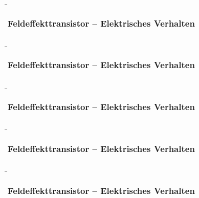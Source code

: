 \begin{frame}
    \b{ \frametitle{Feldeffekttransistor -- Elektrisches Verhalten}
        \begin{figure}[H]
            \centering
            
        \end{figure}

    }
\end{frame}

\begin{frame}
    \b{ \frametitle{Feldeffekttransistor -- Elektrisches Verhalten}
        \begin{figure}[H]
            \centering
            
        \end{figure}
    }
\end{frame}

\begin{frame}
    \b{ \frametitle{Feldeffekttransistor -- Elektrisches Verhalten}
        \begin{figure}[H]
            \centering
            
        \end{figure}
    }
\end{frame}

\begin{frame}
    \b{ \frametitle{Feldeffekttransistor -- Elektrisches Verhalten}
        \begin{figure}[H]
            \centering
            
        \end{figure}
    }
\end{frame}

\begin{frame}
    \b{ \frametitle{Feldeffekttransistor -- Elektrisches Verhalten}
        \begin{figure}[H]
            \centering
            
        \end{figure}
    }
\end{frame}


